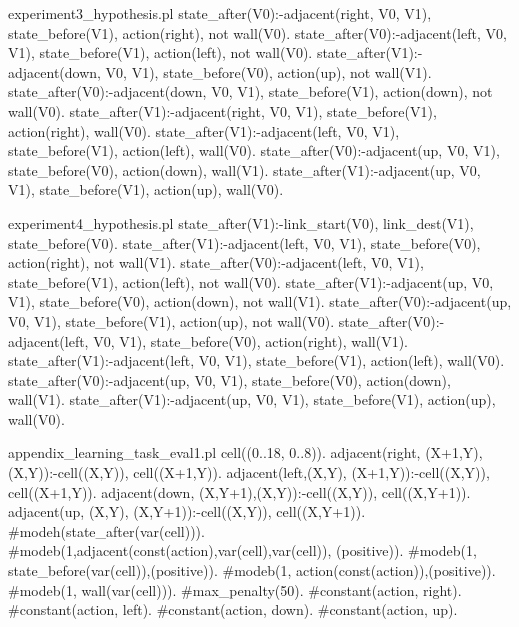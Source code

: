 \begin{filecontents*}{experiment3_hypothesis.pl}
state_after(V0):-adjacent(right, V0, V1), state_before(V1), 
                 action(right), not wall(V0).
state_after(V0):-adjacent(left, V0, V1), state_before(V1), 
                 action(left), not wall(V0).
state_after(V1):-adjacent(down, V0, V1), state_before(V0), 
                 action(up), not wall(V1).
state_after(V0):-adjacent(down, V0, V1), state_before(V1), 
                 action(down), not wall(V0).
state_after(V1):-adjacent(right, V0, V1), state_before(V1), 
                 action(right), wall(V0).
state_after(V1):-adjacent(left, V0, V1), state_before(V1), 
                 action(left), wall(V0).
state_after(V0):-adjacent(up, V0, V1), state_before(V0), 
                 action(down), wall(V1).
state_after(V1):-adjacent(up, V0, V1), state_before(V1), 
                 action(up), wall(V0).
\end{filecontents*}
  
\begin{filecontents*}{experiment4_hypothesis.pl}
state_after(V1):-link_start(V0), link_dest(V1), 
                 state_before(V0).
state_after(V1):-adjacent(left, V0, V1), state_before(V0), 
                 action(right), not wall(V1).
state_after(V0):-adjacent(left, V0, V1), state_before(V1), 
                 action(left), not wall(V0).
state_after(V1):-adjacent(up, V0, V1), state_before(V0), 
                 action(down), not wall(V1).
state_after(V0):-adjacent(up, V0, V1), state_before(V1), 
                 action(up), not wall(V0).
state_after(V0):-adjacent(left, V0, V1), state_before(V0), 
                 action(right), wall(V1).
state_after(V1):-adjacent(left, V0, V1), state_before(V1), 
                 action(left), wall(V0).
state_after(V0):-adjacent(up, V0, V1), state_before(V0), 
                 action(down), wall(V1).
state_after(V1):-adjacent(up, V0, V1), state_before(V1), 
                 action(up), wall(V0).  
\end{filecontents*}

\begin{filecontents*}{appendix_learning_task_eval1.pl}
cell((0..18, 0..8)).
adjacent(right, (X+1,Y),(X,Y)):-cell((X,Y)), cell((X+1,Y)).
adjacent(left,(X,Y),  (X+1,Y)):-cell((X,Y)), cell((X+1,Y)).
adjacent(down, (X,Y+1),(X,Y)):-cell((X,Y)), cell((X,Y+1)).
adjacent(up,   (X,Y),  (X,Y+1)):-cell((X,Y)), cell((X,Y+1)).
#modeh(state_after(var(cell))).
#modeb(1,adjacent(const(action),var(cell),var(cell)),
      (positive)).
#modeb(1, state_before(var(cell)),(positive)).
#modeb(1, action(const(action)),(positive)).
#modeb(1, wall(var(cell))).
#max_penalty(50).
#constant(action, right).
#constant(action, left).
#constant(action, down).
#constant(action, up).
\end{filecontents*}

